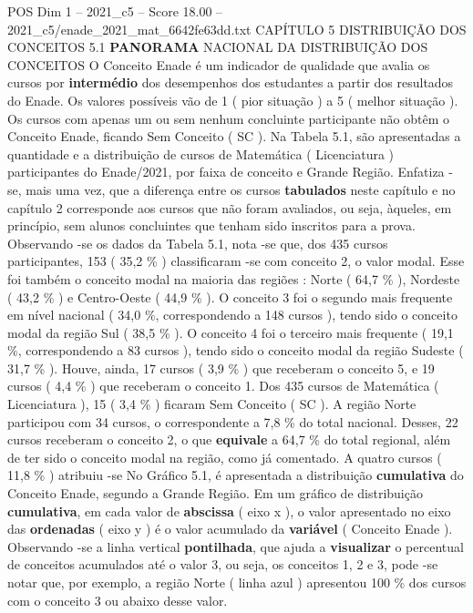 \begin{textsample}{POS Dim 1 – 2021\_c5 – Score 18.00 – 2021\_c5/enade\_2021\_mat\_6642fe63dd.txt}  \label{ex:f1_pos_031}
CAPÍTULO 5 DISTRIBUIÇÃO DOS CONCEITOS 5.1 \textbf{PANORAMA} NACIONAL DA DISTRIBUIÇÃO DOS CONCEITOS O Conceito Enade é um indicador de qualidade que avalia os cursos por \textbf{intermédio} dos desempenhos dos estudantes a partir dos resultados do Enade.
Os valores possíveis vão de 1 ( pior situação ) a 5 ( melhor situação ).
Os cursos com apenas um ou sem nenhum concluinte participante não obtêm o Conceito Enade, ficando Sem Conceito ( SC ).
Na Tabela 5.1, são apresentadas a quantidade e a distribuição de cursos de Matemática ( Licenciatura ) participantes do Enade/2021, por faixa de conceito e Grande Região.
Enfatiza -se, mais uma vez, que a diferença entre os cursos \textbf{tabulados} neste capítulo e no capítulo 2 corresponde aos cursos que não foram avaliados, ou seja, àqueles, em princípio, sem alunos concluintes que tenham sido inscritos para a prova.
Observando -se os dados da Tabela 5.1, nota -se que, dos 435 cursos participantes, 153 ( 35,2 \% ) classificaram -se com conceito 2, o valor modal.
Esse foi também o conceito modal na maioria das regiões : Norte ( 64,7 \% ), Nordeste ( 43,2 \% ) e Centro-Oeste ( 44,9 \% ).
O conceito 3 foi o segundo mais frequente em nível nacional ( 34,0 \%, correspondendo a 148 cursos ), tendo sido o conceito modal da região Sul ( 38,5 \% ).
O conceito 4 foi o terceiro mais frequente ( 19,1 \%, correspondendo a 83 cursos ), tendo sido o conceito modal da região Sudeste ( 31,7 \% ).
Houve, ainda, 17 cursos ( 3,9 \% ) que receberam o conceito 5, e 19 cursos ( 4,4 \% ) que receberam o conceito 1.
Dos 435 cursos de Matemática ( Licenciatura ), 15 ( 3,4 \% ) ficaram Sem Conceito ( SC ).
A região Norte participou com 34 cursos, o correspondente a 7,8 \% do total nacional.
Desses, 22 cursos receberam o conceito 2, o que \textbf{equivale} a 64,7 \% do total regional, além de ter sido o conceito modal na região, como já comentado.
A quatro cursos ( 11,8 \% ) atribuiu -se No Gráfico 5.1, é apresentada a distribuição \textbf{cumulativa} do Conceito Enade, segundo a Grande Região.
Em um gráfico de distribuição \textbf{cumulativa}, em cada valor de \textbf{abscissa} ( eixo x ), o valor apresentado no eixo das \textbf{ordenadas} ( eixo y ) é o valor acumulado da \textbf{variável} ( Conceito Enade ).
Observando -se a linha vertical \textbf{pontilhada}, que ajuda a \textbf{visualizar} o percentual de conceitos acumulados até o valor 3, ou seja, os conceitos 1, 2 e 3, pode -se notar que, por exemplo, a região Norte ( linha azul ) apresentou 100 \% dos cursos com o conceito 3 ou abaixo desse valor.

\end{textsample}
